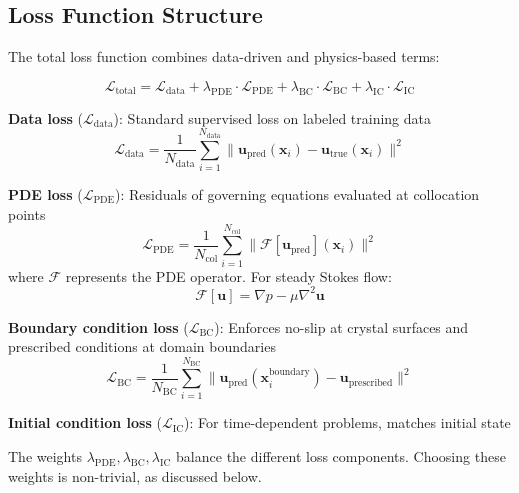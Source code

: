 \subsection{Loss Function Structure}

The total loss function combines data-driven and physics-based terms:

\begin{equation}
\mathcal{L}_{\text{total}} = \mathcal{L}_{\text{data}} + \lambda_{\text{PDE}} \cdot \mathcal{L}_{\text{PDE}} + \lambda_{\text{BC}} \cdot \mathcal{L}_{\text{BC}} + \lambda_{\text{IC}} \cdot \mathcal{L}_{\text{IC}}
\label{eq:pinn_loss}
\end{equation}

\textbf{Data loss} ($\mathcal{L}_{\text{data}}$): Standard supervised loss on labeled training data
\begin{equation}
\mathcal{L}_{\text{data}} = \frac{1}{N_{\text{data}}} \sum_{i=1}^{N_{\text{data}}} \|\mathbf{u}_{\text{pred}}(\mathbf{x}_i) - \mathbf{u}_{\text{true}}(\mathbf{x}_i)\|^2
\end{equation}

\textbf{PDE loss} ($\mathcal{L}_{\text{PDE}}$): Residuals of governing equations evaluated at collocation points
\begin{equation}
\mathcal{L}_{\text{PDE}} = \frac{1}{N_{\text{col}}} \sum_{i=1}^{N_{\text{col}}} \|\mathcal{F}[\mathbf{u}_{\text{pred}}](\mathbf{x}_i)\|^2
\end{equation}
where $\mathcal{F}$ represents the PDE operator. For steady Stokes flow:
\begin{equation}
\mathcal{F}[\mathbf{u}] = \nabla p - \mu \nabla^2 \mathbf{u}
\end{equation}

\textbf{Boundary condition loss} ($\mathcal{L}_{\text{BC}}$): Enforces no-slip at crystal surfaces and prescribed conditions at domain boundaries
\begin{equation}
\mathcal{L}_{\text{BC}} = \frac{1}{N_{\text{BC}}} \sum_{i=1}^{N_{\text{BC}}} \|\mathbf{u}_{\text{pred}}(\mathbf{x}_i^{\text{boundary}}) - \mathbf{u}_{\text{prescribed}}\|^2
\end{equation}

\textbf{Initial condition loss} ($\mathcal{L}_{\text{IC}}$): For time-dependent problems, matches initial state

The weights $\lambda_{\text{PDE}}, \lambda_{\text{BC}}, \lambda_{\text{IC}}$ balance the different loss components. Choosing these weights is non-trivial, as discussed below.

